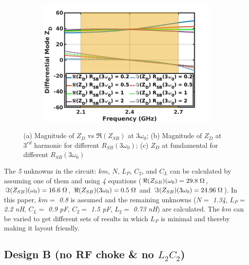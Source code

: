 \documentclass[conference]{IEEEtran}
\begin{document}
\begin{figure}[!t]
\begin{subfigure}{0.4\textwidth}
\includegraphics[width=1\textwidth]{Images/Design/Design_A_Rn_var_1H.jpg}
\caption{}
\label{fig:Design_A_Rn_var_1H}
\end{subfigure}
\caption{(a) Magnitude of $Z_{D}$ vs $\Re(Z_{SB})$ at $3\omega_0$; (b) Magnitude of $Z_D$ at $3^{rd}$ harmonic for different $R_{SB}(3\omega_0)$; (c) $Z_D$ at fundamental for different $R_{SB}(3\omega_0)$}
\label{fig:Design_A_Rn_var}
\end{figure}

The \textit{5} unknowns in the circuit: $km$, $N$, $L_P$, $C_2$, and $C_L$ can be calculated by assuming one of them and using \textit{4} equations ($\Re(Z_{SB})(\omega_0) =  29.8\hspace{1mm} \Omega$, $\Im(Z_{SB})(\omega_0) = 16.6\hspace{1mm}\Omega$, $\Re(Z_{SB})(3\omega_0) = 0.5\hspace{1mm}\Omega$ and  $\Im(Z_{SB})(3\omega_0) = 24.96\hspace{1mm}\Omega$). In this paper, $km =$ \textit{0.8} is assumed and the remaining unknowns ($N =$ \textit{1.34}, $L_P =$ \textit{2.2 nH}, $C_L =$ \textit{0.9 pF}, $C_2 =$ \textit{1.5 pF}, $L_2 =$ \textit{0.73 nH}) are calculated. The $km$ can be varied to get different sets of results in which $L_P$ is minimal and thereby making it layout friendly.


\subsection{Design B (no RF choke \& no $L_2C_2$)}
\end{document}
